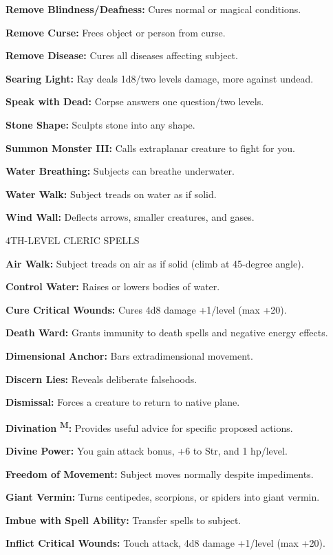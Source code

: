 \documentclass{article}
\begin{document}
\textbf{Remove Blindness/Deafness:} Cures normal or magical conditions.

\textbf{Remove Curse:} Frees object or person from curse.

\textbf{Remove Disease:} Cures all diseases affecting subject.

\textbf{Searing Light:} Ray deals 1d8/two levels damage, more against undead.

\textbf{Speak with Dead:} Corpse answers one question/two levels.

\textbf{Stone Shape:} Sculpts stone into any shape.

\textbf{Summon Monster III:} Calls extraplanar creature to fight for you.

\textbf{Water Breathing:} Subjects can breathe underwater.

\textbf{Water Walk:} Subject treads on water as if solid.

\textbf{Wind Wall:} Deflects arrows, smaller creatures, and gases.

4TH-LEVEL CLERIC SPELLS

\textbf{Air Walk:} Subject treads on air as if solid (climb at 45-degree angle).

\textbf{Control Water:} Raises or lowers bodies of water.

\textbf{Cure Critical Wounds:} Cures 4d8 damage +1/level (max +20).

\textbf{Death Ward:} Grants immunity to death spells and negative energy effects.

\textbf{Dimensional Anchor:} Bars extradimensional movement.

\textbf{Discern Lies:} Reveals deliberate falsehoods.

\textbf{Dismissal:} Forces a creature to return to native plane.

\textbf{Divination }\textsuperscript{\textbf{M}}\textbf{:} Provides useful advice 
for specific proposed actions.

\textbf{Divine Power:} You gain attack bonus, +6 to Str, and 1 hp/level.

\textbf{Freedom of Movement:} Subject moves normally despite impediments.

\textbf{Giant Vermin:} Turns centipedes, scorpions, or spiders into giant vermin.

\textbf{Imbue with Spell Ability:} Transfer spells to subject.

\textbf{Inflict Critical Wounds:} Touch attack, 4d8 damage +1/level (max +20).
\end{document}
